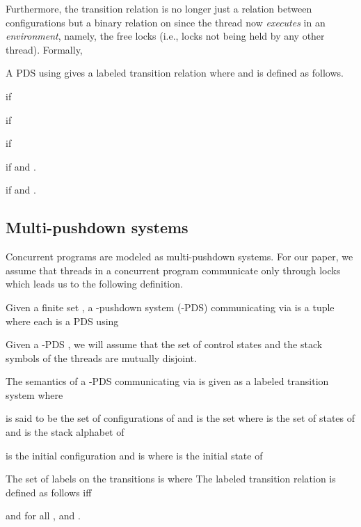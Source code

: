 \documentclass{LMCS}
\begin{document}
 Furthermore, the transition relation is no longer just
 a relation between configurations but  a binary relation on  since
 the thread now {\it executes} in an {\it environment}, namely, the free locks (i.e., locks not being held by any other thread).
 Formally,



 \begin{definition}
 A PDS  using  gives  a labeled
 transition relation  where  and
  is defined as follows.
 \begin{iteMize}{}
 \item  if 
 \item  if 
 \item  if 
 \item  if  and .
 \item  if   and
 .
 \end{iteMize}
 \end{definition}












\subsection{Multi-pushdown systems} Concurrent programs are modeled as multi-pushdown systems.
For our paper, we assume that  threads in a concurrent program communicate only through locks which leads
us to the following definition.
\begin{definition}
Given a finite set , a -pushdown system (-PDS)  communicating via 
is a tuple  where each  is a PDS using 
\end{definition}

Given a -PDS ,
we will assume that the set of control states and the stack symbols of the threads are mutually disjoint.
\begin{definition}
The semantics of a -PDS  communicating via  is given as a labeled transition system  where
\begin{iteMize}{}
\item  is said to be the set of configurations of  and  is the set  where  is the set of states of  and  is the stack alphabet of 
\item  is the initial configuration and is  where  is the initial state of 

\item The set of labels on the transitions  is  where 
The labeled transition relation  is defined as follows
  iff
      
      and for all ,
        and .
\end{iteMize}
\end{definition}
\end{document}
